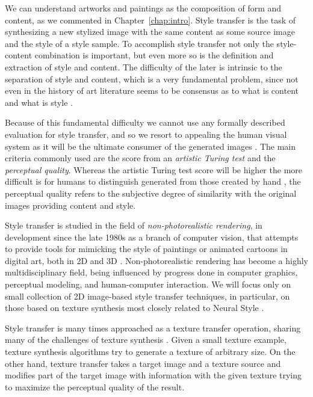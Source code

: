 We can understand artworks and paintings as the composition of form and content, as we commented in Chapter~\ref{chap:intro}.
Style transfer is the task of synthesizing a new stylized image with the same content as some source image and the style of a style sample.
To accomplish style transfer not only the style-content combination is important, but even more so is the definition and extraction of style and content.
The difficulty of the later is intrinsic to the separation of style and content, which is a very fundamental problem, since not even in the history of art literature seems to be consensus as to what is content and what is style \cite{Xie2007}.

Because of this fundamental difficulty we cannot use any formally described evaluation for style transfer, and so we resort to appealing the human visual system as it will be the ultimate consumer of the generated images \cite{Lin2011}.
The main criteria commonly used are the score from an \emph{artistic Turing test} and the \emph{perceptual quality}.
Whereas the artistic Turing test score will be higher the more difficult is for humans to distinguish generated from those created by hand \cite{Kyprianidis2013}, the perceptual quality refers to the subjective degree of similarity with the original images providing content and style.

Style transfer is studied in the field of \emph{non-photorealistic rendering}, in development since the late 1980s as a branch of computer vision, that attempts to provide tools for mimicking the style of paintings or animated cartoons in digital art, both in 2D and 3D \cite{Lee2010, Kyprianidis2013}.
Non-photorealistic rendering has become a highly multidisciplinary field, being influenced by progress done in computer graphics, perceptual modeling, and human-computer interaction.
We will focus only on small collection of 2D image-based style transfer techniques, in particular, on those based on texture synthesis most closely related to Neural Style \cite{Gatys2015B}.

Style transfer is many times approached as a texture transfer operation, sharing many of the challenges of texture synthesis \cite{Ashikhmin2003}.
Given a small texture example, texture synthesis algorithms try to generate a texture of arbitrary size.
On the other hand, texture transfer takes a target image and a texture source and modifies part of the target image with information with the given texture trying to maximize the perceptual quality of the result.


